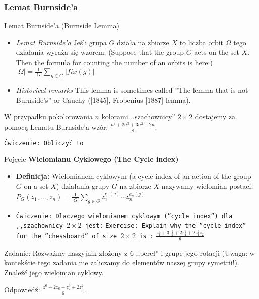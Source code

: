 \documentclass[a4paper, 11pt, xcolor=dvipsnames]{beamer}
\begin{document}
\begin{frame}\frametitle{Lemat Burnside'a}
  \begin{block}{Lemat Burnside'a (Burnside Lemma)}  
  \begin{itemize}
  \item<1-> {\it Lemat Burnside'a}
    Jeśli grupa $G$ działa na zbiorze $X$ to
    liczba orbit $\Omega$ tego działania
    wyraża się wzorem:
    (Suppose that the group $G$ acts on the set $X$. Then
    the formula for counting the number of an orbits
    is here:)
    $|\Omega| = \frac{1}{|G|} \sum_{g\in G} |fix(g)|$
  \item<2-> {\it Historical remarks}
    This lemma is sometimes called ''The lemma that is not Burnside's''
    or Cauchy ([1845], Frobenius [1887] lemma).
  \end{itemize}
  \end{block}  
\end{frame}

\begin{frame}
  W przypadku pokolorowania $n$ kolorami ,,szachownicy'' $2\times 2$
  dostajemy za pomocą Lematu Burnside'a wzór:
  $\frac{n^4 + 2 n^3 + 3 n^2 + 2 n }{8}$.

  {\tt Ćwiczenie: Obliczyć to}
  
\end{frame}

\begin{frame}
  \begin{block}{Pojęcie {\bf Wielomianu Cyklowego (The Cycle index)}}
  \begin{itemize}
  \item<1-> 
    {\bf Definicja:} Wielomianem cyklowym (a cycle index of an action of
    the group $G$ on a set $X$) działania grupy $G$  na zbiorze $X$ nazywamy
    wielomian postaci:
    $P_G(z_1, \ldots, z_n) = \frac{1}{|G|} \sum_{g\in G} z_1^{c_1(g)} \cdots z_n^{c_n(g)}$
  
  \item<2->  {\tt Ćwiczenie: Dlaczego wielomianem cyklowym (''cycle index'')
      dla ,,szachownicy $2\times 2$ jest:}
  {\tt Exercise: Explain why the ''cycle index'' for the ''chessboard'' of
    size $2\times 2$ is :}
  $\frac{z_1^4 + 3 z_2^2 + 2 z_4^1 + 2 z_1^2 z_2}{8}$
  \end{itemize}
  \end{block}
\end{frame}

\begin{frame}
  \begin{block}{Zadanie:}
    Rozważmy naszyjnik złożony z $6$ ,,pereł''
    i grupę jego rotacji (Uwaga: w kontekście tego zadania nie zaliczamy do elementów naszej grupy
    symetrii!).
    Znaleźć jego wielomian cyklowy.
  \end{block}
  Odpowiedź: $\frac{z_1^6 + 2 z_6 + z_2^3 + 2 z_3^2}{6}$.
\end{frame}
\end{document}
